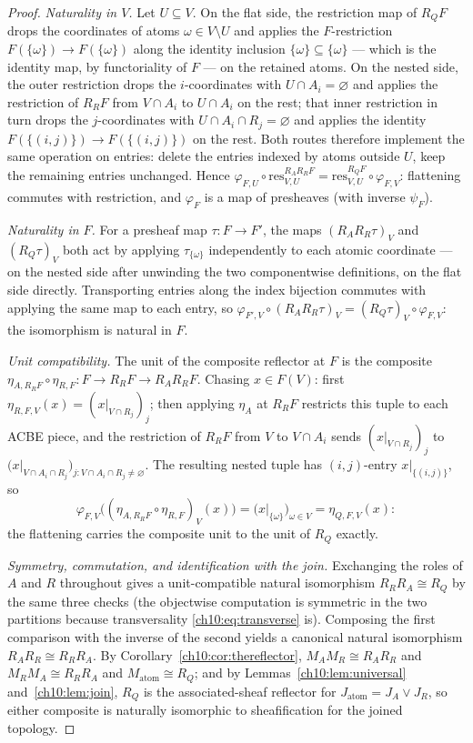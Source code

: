 \begin{proof}
\emph{Naturality in $V$.} Let $U \subseteq V$. On the flat side, the
restriction map of $R_Q F$ drops the coordinates of atoms
$\omega \in V \setminus U$ and applies the $F$-restriction
$F(\{\omega\}) \to F(\{\omega\})$ along the identity inclusion
$\{\omega\} \subseteq \{\omega\}$ --- which is the identity map, by
functoriality of $F$ --- on the retained atoms. On the nested side, the outer
restriction drops the $i$-coordinates with $U \cap A_i = \varnothing$ and
applies the restriction of $R_R F$ from $V \cap A_i$ to $U \cap A_i$ on the
rest; that inner restriction in turn drops the $j$-coordinates with
$U \cap A_i \cap R_j = \varnothing$ and applies the identity
$F(\{(i,j)\}) \to F(\{(i,j)\})$ on the rest. Both routes therefore implement
the same operation on entries: delete the entries indexed by atoms outside
$U$, keep the remaining entries unchanged. Hence
$\varphi_{F, U} \circ \mathrm{res}^{R_A R_R F}_{V, U}
= \mathrm{res}^{R_Q F}_{V, U} \circ \varphi_{F, V}$: flattening commutes with
restriction, and $\varphi_F$ is a map of presheaves (with inverse
$\psi_F$).

\emph{Naturality in $F$.} For a presheaf map $\tau : F \to F'$, the maps
$(R_A R_R \tau)_V$ and $(R_Q \tau)_V$ both act by applying
$\tau_{\{\omega\}}$ independently to each atomic coordinate --- on the nested
side after unwinding the two componentwise definitions, on the flat side
directly. Transporting entries along the index bijection commutes with
applying the same map to each entry, so
$\varphi_{F', V} \circ (R_A R_R \tau)_V = (R_Q \tau)_V \circ \varphi_{F, V}$:
the isomorphism is natural in $F$.

\emph{Unit compatibility.} The unit of the composite reflector at $F$ is the
composite $\eta_{A, R_R F} \circ \eta_{R, F} : F \to R_R F \to R_A R_R F$.
Chasing $x \in F(V)$: first
$\eta_{R, F, V}(x) = (x|_{V \cap R_j})_j$; then applying $\eta_{A}$ at
$R_R F$ restricts this tuple to each ACBE piece, and the restriction of
$R_R F$ from $V$ to $V \cap A_i$ sends $(x|_{V \cap R_j})_j$ to
$\bigl( x|_{V \cap A_i \cap R_j} \bigr)_{j : V \cap A_i \cap R_j \neq
\varnothing}$. The resulting nested tuple has $(i, j)$-entry
$x|_{\{(i, j)\}}$, so
\[
\varphi_{F, V}\bigl( (\eta_{A, R_R F} \circ \eta_{R, F})_V (x) \bigr)
= \bigl( x|_{\{\omega\}} \bigr)_{\omega \in V}
= \eta_{Q, F, V}(x):
\]
the flattening carries the composite unit to the unit of $R_Q$ exactly.

\emph{Symmetry, commutation, and identification with the join.} Exchanging
the roles of $A$ and $R$ throughout gives a unit-compatible natural
isomorphism $R_R R_A \cong R_Q$ by the same three checks (the objectwise
computation is symmetric in the two partitions because transversality
\eqref{ch10:eq:transverse} is). Composing the first comparison with the
inverse of the second yields a canonical natural isomorphism
$R_A R_R \cong R_R R_A$. By Corollary~\ref{ch10:cor:thereflector},
$M_A M_R \cong R_A R_R$ and $M_R M_A \cong R_R R_A$ and
$M_{\mathrm{atom}} \cong R_Q$; and by Lemmas~\ref{ch10:lem:universal}
and~\ref{ch10:lem:join}, $R_Q$ is the associated-sheaf reflector for
$J_{\mathrm{atom}} = J_A \vee J_R$, so either composite is naturally
isomorphic to sheafification for the joined topology.


\end{proof}
